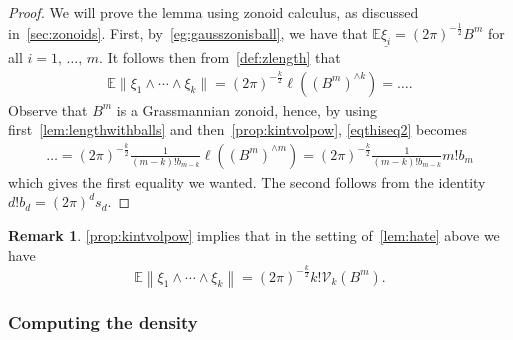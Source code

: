 \documentclass[10pt]{amsart}
\theoremstyle{definition}\newtheorem{defi}[theo]{Definition}\newtheorem{rema}[theo]{Remark}\newtheorem{exam}[theo]{Example}\newtheorem{exem}[theo]{Example}\newtheorem{nota}[theo]{Notation}
\newcommand{\EE}{\mathbb{E}}
\newcommand{\Vint}{\mathcal{V}}
\newcommand{\seg}{\underline}
\newcommand{\uball}{b}
\begin{document}
\begin{proof}
We will prove the lemma using zonoid calculus, as discussed in~\cref{sec:zonoids}. First, by~\cref{eg:gausszonisball}, we have that $\EE\seg{\xi_i}=(2\pi)^{-\tfrac12} B^m$ for all $i=1,\,\ldots,\,m$. It follows then from~\cref{def:zlength} that
\begin{equation}\label{eqthiseq2}
\begin{split}
\EE\|\xi_1\wedge\cdots\wedge\xi_k\|=(2\pi)^{-\frac k2}\ell\left((B^m)^{\wedge k}\right)=\dots.
\end{split}
\end{equation}
Observe that $B^m$ is a Grassmannian zonoid, hence, by using first~\cref{lem:lengthwithballs} and then~\cref{prop:kintvolpow}, \eqref{eqthiseq2} becomes
\begin{equation*}
\begin{split}
\dots=(2\pi)^{-\frac k2}\frac{1}{(m-k)!\uball_{m-k}}\ell\left((B^m)^{\wedge m}\right)=(2\pi)^{-\frac k2}\frac{1}{(m-k)!\uball_{m-k}}m!\uball_m
\end{split}
\end{equation*}
which gives the first equality we wanted. The second follows from the identity $d!\uball_d=(2\pi)^ds_d$.
\end{proof}

\begin{rema}
\cref{prop:kintvolpow} implies that in the setting of~\cref{lem:hate} above we have
\begin{equation}\label{eq:plugin}
\EE\left\|\xi_1\wedge\cdots\wedge\xi_k\right\|=(2\pi)^{-\frac k2}k!\Vint_k(B^m).
\end{equation}
\end{rema}

\subsubsection{Computing the density} 
\end{document}
